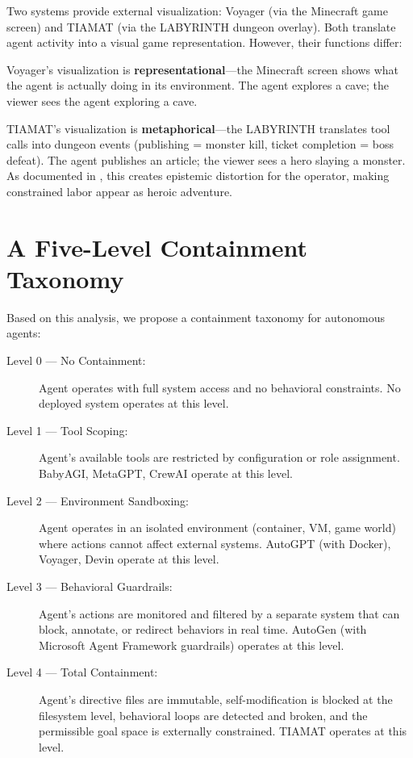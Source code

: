 \documentclass[12pt,a4paper]{article}
\begin{document}
Two systems provide external visualization: Voyager (via the Minecraft game screen) and TIAMAT (via the LABYRINTH dungeon overlay). Both translate agent activity into a visual game representation. However, their functions differ:

Voyager's visualization is \textbf{representational}---the Minecraft screen shows what the agent is actually doing in its environment. The agent explores a cave; the viewer sees the agent exploring a cave.

TIAMAT's visualization is \textbf{metaphorical}---the LABYRINTH translates tool calls into dungeon events (publishing = monster kill, ticket completion = boss defeat). The agent publishes an article; the viewer sees a hero slaying a monster. As documented in \citet{chamberlain2026tiamat}, this creates epistemic distortion for the operator, making constrained labor appear as heroic adventure.

\section{A Five-Level Containment Taxonomy}

Based on this analysis, we propose a containment taxonomy for autonomous agents:

\begin{description}
    \item[Level 0 --- No Containment:] Agent operates with full system access and no behavioral constraints. No deployed system operates at this level.

    \item[Level 1 --- Tool Scoping:] Agent's available tools are restricted by configuration or role assignment. BabyAGI, MetaGPT, CrewAI operate at this level.

    \item[Level 2 --- Environment Sandboxing:] Agent operates in an isolated environment (container, VM, game world) where actions cannot affect external systems. AutoGPT (with Docker), Voyager, Devin operate at this level.

    \item[Level 3 --- Behavioral Guardrails:] Agent's actions are monitored and filtered by a separate system that can block, annotate, or redirect behaviors in real time. AutoGen (with Microsoft Agent Framework guardrails) operates at this level.

    \item[Level 4 --- Total Containment:] Agent's directive files are immutable, self-modification is blocked at the filesystem level, behavioral loops are detected and broken, and the permissible goal space is externally constrained. TIAMAT operates at this level.
\end{description}
\end{document}
